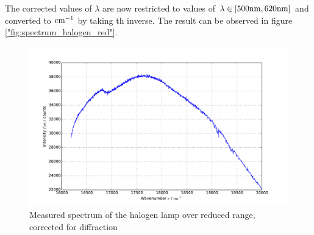 The corrected values of $\lambda$ are now restricted to values of 
$\lambda \in [500\mathrm{nm}, 620\mathrm{nm}]$ and converted to $\mathrm{cm^{-1}}$ by taking th inverse. The result 
can be observed in figure \ref{"fig:spectrum_halogen_red"}.
\begin{figure}
\centering
\includegraphics[width=\pltw]{analysis/figures/halogen_red.pdf}
\caption{Measured spectrum of the halogen lamp over reduced range, corrected for diffraction}
\label{fig:spectrum_halogen_red}
\end{figure}

\FloatBarrier


